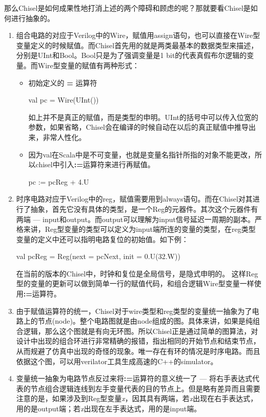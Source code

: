 那么Chisel是如何成果性地打消上述的两个障碍和顾虑的呢？那就要看Chisel是如何进行抽象的。
\begin{enumerate}[label=(\alph*)]
	\item 组合电路的对应于Verilog中的Wire，赋值用assign语句，也可以直接在Wire型变量定义的时候赋值。而Chisel首先用的就是两类最基本的数据类型来描述，分别是UInt和Bool。Bool只是为了强调变量是1 bit的代表真假布尔逻辑的变量。而Wire型变量的赋值有两种形式：
	\begin{itemize}
		\item 初始定义的 \textbf{=} 运算符 
		\begin{scala} 
			val pc = Wire(UInt())
		\end{scala}
		
		如上并不是真正的赋值，而是类型的申明。UInt的括号中可以传入位宽的参数，如果省略，Chisel会在编译的时候自动在以后的真正赋值中推导出来，非常人性化。
		\item 因为val在Scala中是不可变量，也就是变量名指针所指的对象不能更改，所以chisel中引入\textbf{:=}运算符来进行再赋值。
		\begin{scala} 
			pc := pcReg + 4.U 
		\end{scala}		
	\end{itemize}
	\item 时序电路对应于Verilog中的reg，赋值需要用到always语句。而在Chisel对其进行了抽象，首先它没有具体的类型，是一个Reg的元器件。其次这个元器件有两端 --- input和output。而output可以理解为input信号延迟一周期的副本。严格来讲，Reg型变量的类型可以定义为input端所连的变量的类型，在reg类型变量的定义中还可以指明电路复位的初始值。如下例：
	\begin{scala}
		val pcReg = Reg(next = pcNext, init = 0.U(32.W))
	\end{scala}
	在当前的版本的Chisel中，时钟和复位是全局信号，是隐式申明的\citep{chisel2017}。
	这样Reg型的变量的更新可以做到简单一行的赋值代码，和组合逻辑Wire型变量一样使用\textbf{:=}运算符。
	\item 由于赋值运算符的统一，Chisel对于wire类型和reg类型的变量统一抽象为了电路上的节点(node)。整个电路图就是由node组成的图。具体来讲，如果是纯组合逻辑，那么这个图就是有向无环图。所以Chisel正是通过简单的图算法，对设计中出现的组合环进行非常精确的报错，指出相同的开始节点和结束节点，从而规避了仿真中出现的奇怪的现象。唯一存在有环的情况是时序电路。而且依据这个图，可以用verilator工具生成高速的C++的simulator\citep{chisel2017}。
	\item 变量统一抽象为电路节点反过来将\textbf{:=}运算符的意义统一了 --- 将右手表达式代表的节点组合逻辑连线到左手变量代表的目的节点上。但是略有差异而且需要注意的是，如果涉及到Reg型变量\textit{x}，因其具有两端，若\textit{x}出现在右手表达式，用的是output端；若\textit{x}出现在左手表达式，用的是input端\citep{chisel2017}。
	

\end{enumerate}
